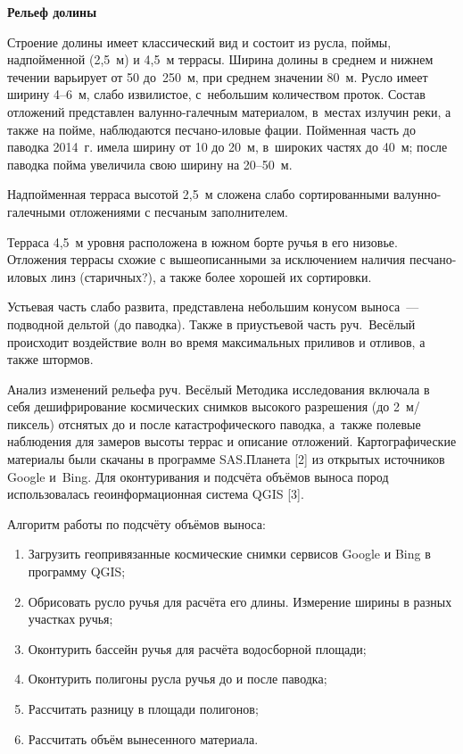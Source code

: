 \textbf{Рельеф долины}

Строение долины имеет классический вид и состоит из русла, поймы, надпойменной (2,5~м) и 4,5~м террасы. Ширина долины в среднем и нижнем течении варьирует от 50 до~250~м, при среднем значении 80~м. Русло имеет ширину 4--6~м, слабо извилистое, с~небольшим количеством проток. Состав отложений представлен валунно-галечным материалом, в~местах излучин реки, а также на пойме, наблюдаются песчано-иловые фации. Пойменная часть до паводка 2014~г. имела ширину от 10 до 20~м, в широких частях до 40~м; после паводка пойма увеличила свою ширину на 20--50~м.

Надпойменная терраса высотой 2,5~м сложена слабо сортированными валунно-галечными отложениями с песчаным заполнителем.

Терраса 4,5~м уровня расположена в южном борте ручья в его низовье. Отложения террасы схожие с вышеописанными за исключением наличия песчано-иловых линз (старичных?), а также более хорошей их сортировки.

Устьевая часть слабо развита, представлена небольшим конусом выноса~--- подводной дельтой (до паводка). Также в приустьевой часть руч.~Весёлый происходит воздействие волн во время максимальных приливов и отливов, а также штормов.

Анализ изменений рельефа руч. Весёлый
Методика исследования включала в себя дешифрирование космических снимков высокого разрешения (до 2 м/пиксель) отснятых до и после катастрофического паводка, а~также полевые наблюдения для замеров высоты террас и описание отложений. Картографические материалы были скачаны в программе SAS.Планета [2] из открытых источников Google и~Bing. Для оконтуривания и подсчёта объёмов выноса пород использовалась геоинформационная система QGIS [3].

Алгоритм работы по подсчёту объёмов выноса:
\begin{enumerate}[noitemsep]\vspace{-8pt}
  \item Загрузить геопривязанные космические снимки сервисов Google и Bing в программу QGIS;
  \item Обрисовать русло ручья для расчёта его длины. Измерение ширины в разных участках ручья;
  \item Оконтурить бассейн ручья для расчёта водосборной площади;
  \item Оконтурить полигоны русла ручья до и после паводка;
  \item Рассчитать разницу в площади полигонов;
  \item Рассчитать объём вынесенного материала.
\end{enumerate}\vspace{-8pt}

